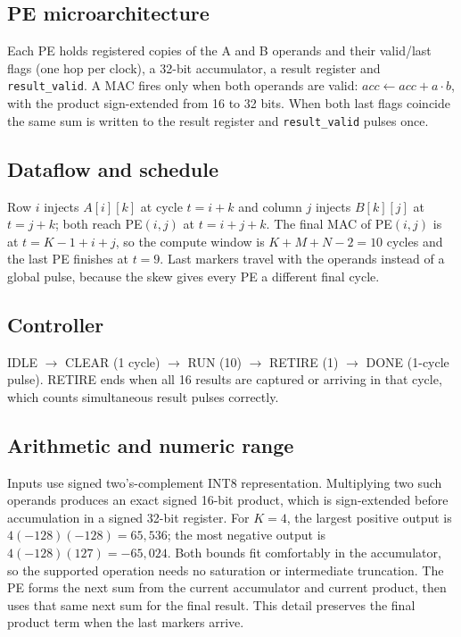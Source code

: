 \documentclass[conference]{IEEEtran}
\begin{document}
\subsection{PE microarchitecture}
Each PE holds registered copies of the A and B operands and their valid/last flags (one hop per clock), a 32-bit accumulator,
a result register and \texttt{result\_valid}. A MAC fires only when both operands are valid:
$acc\leftarrow acc+a\cdot b$, with the product sign-extended from 16 to 32 bits. When both last flags coincide the same sum is written to
the result register and \texttt{result\_valid} pulses once.

\subsection{Dataflow and schedule}
Row $i$ injects $A[i][k]$ at cycle $t=i+k$ and column $j$ injects $B[k][j]$ at $t=j+k$; both reach PE$(i,j)$ at
$t=i+j+k$. The final MAC of PE$(i,j)$ is at $t=K-1+i+j$, so the compute window is $K+M+N-2=10$ cycles and the last PE finishes at
$t=9$. Last markers travel with the operands instead of a global pulse, because the skew gives every PE a different final cycle.

\subsection{Controller}
IDLE $\rightarrow$ CLEAR (1 cycle) $\rightarrow$ RUN (10) $\rightarrow$ RETIRE (1) $\rightarrow$ DONE (1-cycle pulse). RETIRE ends when all 16
results are captured or arriving in that cycle, which counts simultaneous result pulses correctly.

\subsection{Arithmetic and numeric range}
Inputs use signed two's-complement INT8 representation. Multiplying two such operands produces an exact signed 16-bit
product, which is sign-extended before accumulation in a signed 32-bit register. For $K=4$, the largest positive output
is $4(-128)(-128)=65{,}536$; the most negative output is $4(-128)(127)=-65{,}024$. Both bounds fit comfortably in the
accumulator, so the supported operation needs no saturation or intermediate truncation. The PE forms the next sum from
the current accumulator and current product, then uses that same next sum for the final result. This detail preserves
the final product term when the last markers arrive.
\end{document}
